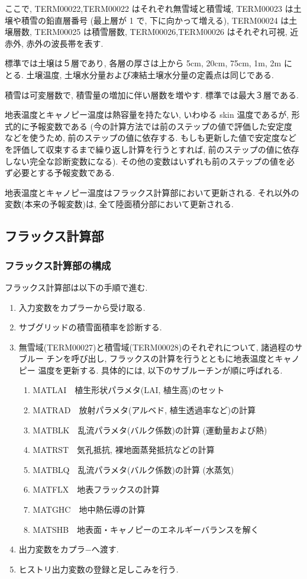 ここで, TERM00022,TERM00022 はそれぞれ無雪域と積雪域, TERM00023 は土壌や積雪の鉛直層番号
(最上層が 1 で, 下に向かって増える), TERM00024 は土壌層数, TERM00025 は積雪層数,
TERM00026,TERM00026 はそれぞれ可視, 近赤外, 赤外の波長帯を表す.

標準では土壌は５層であり, 各層の厚さは上から 5cm, 20cm, 75cm, 1m, 2m に
とる. 土壌温度, 土壌水分量および凍結土壌水分量の定義点は同じである.

積雪は可変層数で, 積雪量の増加に伴い層数を増やす. 標準では最大３層である.

地表温度とキャノピー温度は熱容量を持たない, いわゆる skin 温度であるが,
形式的に予報変数である (今の計算方法では前のステップの値で評価した安定度
などを使うため, 前のステップの値に依存する. もしも更新した値で安定度など
を評価して収束するまで繰り返し計算を行うとすれば, 前のステップの値に依存
しない完全な診断変数になる). その他の変数はいずれも前のステップの値を必
ず必要とする予報変数である.

地表温度とキャノピー温度はフラックス計算部において更新される.
それ以外の変数(本来の予報変数)は, 全て陸面積分部において更新される.

\subsection{フラックス計算部}

\subsubsection{フラックス計算部の構成}

フラックス計算部は以下の手順で進む.
\begin{enumerate}
 \item 入力変数をカプラーから受け取る.
 \item サブグリッドの積雪面積率を診断する.
 \item 無雪域(TERM00027)と積雪域(TERM00028)のそれぞれについて, 諸過程のサブルー
       チンを呼び出し, フラックスの計算を行うとともに地表温度とキャノピー
       温度を更新する. 具体的には, 以下のサブルーチンが順に呼ばれる.
   \begin{enumerate}
    \item MATLAI\ \ 植生形状パラメタ(LAI, 植生高)のセット
    \item MATRAD\ \ 放射パラメタ(アルベド, 植生透過率など)の計算
    \item MATBLK\ \ 乱流パラメタ(バルク係数)の計算 (運動量および熱)
    \item MATRST\ \ 気孔抵抗, 裸地面蒸発抵抗などの計算
    \item MATBLQ\ \ 乱流パラメタ(バルク係数)の計算 (水蒸気)
    \item MATFLX\ \ 地表フラックスの計算
    \item MATGHC\ \ 地中熱伝導の計算
    \item MATSHB\ \ 地表面・キャノピーのエネルギーバランスを解く
   \end{enumerate}
 \item 出力変数をカプラ−へ渡す.
 \item ヒストリ出力変数の登録と足しこみを行う.
\end{enumerate}

